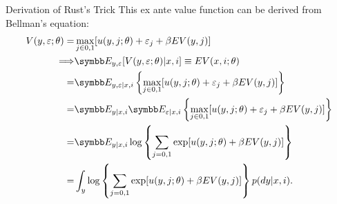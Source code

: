 \documentclass[aspectratio=169,11pt]{beamer}
\begin{document}
\begin{frame}{Derivation of Rust's Trick}
\footnotesize
This \alert{ex ante value function} can be derived from Bellman's equation:
\begin{align*}
\begin{split}
V(y, \varepsilon ;\theta) = & \max_{j \in 0,1} [ u(y, j ; \theta) + \varepsilon_j + \beta EV(y,j)] \\
\Longrightarrow & \E_{y, \varepsilon} [V(y, \varepsilon ; \theta) | x, i ] \equiv  EV(x, i ; \theta) \\
= & \E_{y, \varepsilon | x, i } \left \{ \max_{ j \in 0,1} [ u(y, j ; \theta) + \varepsilon_j + \beta EV(y,j)] \right \} \\
= &  \E_{y | x, i }  \E_{\varepsilon | x, i } \left \{ \max_{ j \in 0,1} [ u(y, j ; \theta) + \varepsilon_j + \beta EV(y,j)] \right \} \\
= &  \E_{y | x, i } \log \left \{ \sum_{j=0,1} \exp [ u(y, j ; \theta)  + \beta EV(y,j)] \right \} \\
= & \int_y \log  \left \{ \sum_{j=0,1} \exp [ u(y, j ; \theta)  + \beta EV(y,j)] \right \} p(dy|x,i).
\end{split}
\end{align*}
\end{frame}
%
\end{document}
